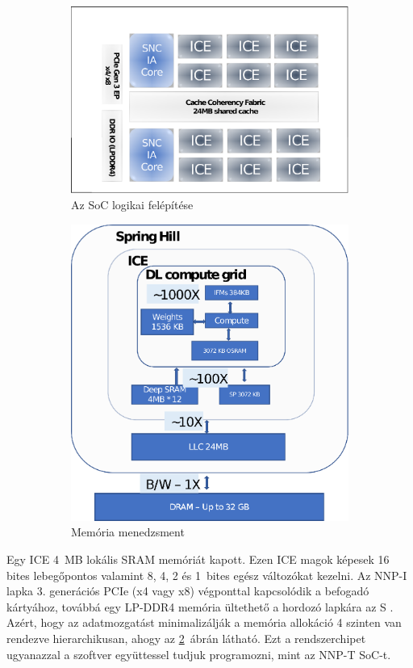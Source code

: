 \begin{figure}[H]
	\centering
	\begin{subfigure}{0.4\textwidth}
		\includegraphics[width=\textwidth]{fig/NNP-I_soc}
		\caption{Az SoC logikai felépítése}
		\label{fig:nnp-isoc}
	\end{subfigure}
	\quad
	\begin{subfigure}{0.4\textwidth}
		\includegraphics[width=\textwidth]{fig/NNP-I_memManagement}
		\caption{Memória menedzsment}
		\label{fig:nnp-imem}
	\end{subfigure}
	\caption{}
	\label{fig:nnp-i}
\end{figure}

Egy ICE 4~MB lokális SRAM memóriát kapott. Ezen ICE magok képesek 16 bites lebegőpontos valamint 8, 4, 2 és 1~bites egész változókat kezelni. Az NNP-I lapka 3. generációs PCIe (x4 vagy x8) végponttal kapcsolódik a befogadó kártyához, továbbá egy LP-DDR4 memória ültethető a hordozó lapkára az S . Azért, hogy az adatmozgatást minimalizálják a memória allokáció 4 szinten van rendezve hierarchikusan, ahogy az \ref{fig:nnp-imem}~ábrán látható. Ezt a rendszerchipet ugyanazzal a szoftver együttessel tudjuk programozni, mint az NNP-T SoC-t.